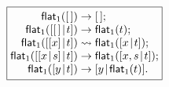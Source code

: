 \documentclass[11pt]{article}
\begin{document}
\TeXtoEPS
\(
\boxed{
\begin{array}{@{}r@{\;}c@{\;}l@{}}
\fun{flat}_1(\el)                   & \rightarrow & \el;\\
\fun{flat}_1(\cons{\el}{t})         & \rightarrow & \fun{flat}_1(t);\\
\fun{flat}_1(\cons{[x]}{t})         & \leadsto & \fun{flat}_1(\cons{x}{t});\\
\fun{flat}_1(\cons{\cons{x}{s}}{t}) & \rightarrow 
                                    & \fun{flat}_1(\cons{x,s}{t});\\
\fun{flat}_1(\cons{y}{t})           & \rightarrow  & \cons{y}{\fun{flat}_1(t)}.
\end{array}}
\)
\endTeXtoEPS
\end{document}
